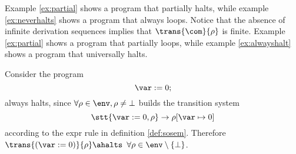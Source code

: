 Example \ref{ex:partial} shows a program that partially halts, while
example \ref{ex:neverhalts} shows a program that always loops.  Notice
that the absence of infinite derivation sequences implies that \(\trans{\com}{\rho}\)
is finite.  Example \ref{ex:partial} shows a program that partially
loops, while example \ref{ex:alwayshalt} shows a program that
universally halts.


\begin{example}\label{ex:alwayshalt}
  Consider the program
  \begin{equation*}
    \var := 0;
  \end{equation*}
  always halts, since \(\forall\rho \in \env, \rho \neq \bot\) builds
  the transition system \[\stt{\var := 0, \rho} \to \rho[\var \mapsto
    0]\] according to the expr rule in definition
  \ref{def:sosem}. Therefore \(\trans{(\var := 0)}{\rho} \ahalts\)
  \(\forall \rho \in \env\setminus\{\bot\}\).
\end{example}

